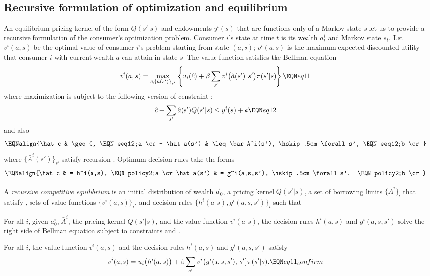 \subsection{Recursive formulation of optimization and equilibrium}
An equilibrium  pricing kernel of the form $Q(s'|s)$ and  endowments $y^i(s)$
that are  functions only of a Markov state $s$ let us to provide a
recursive formulation of the consumer's optimization problem.
Consumer $i$'s state at time $t$ is its wealth $a^i_t$ and Markov state $s_t$.
Let $v^i(a,s)$ be the optimal value of consumer $i$'s problem
starting from state $(a, s)$;     $v^i(a,s)$ is the maximum
expected discounted utility  that consumer $i$ with current wealth $a$
can attain in state $s$.
The value function satisfies the Bellman equation %
$$ v^i(a, s) = \max_{\hat c, \{\hat a(s')\}_{s'}} 
\left\{ u_i(\hat c) + \beta
\sum_{s'} v^i\bigl(\hat a(s'),s'\bigr) 
                 \pi (s' | s) \right\} \EQN eq11 $$
where  maximization is subject to the following version
of constraint :
$$ \hat c + \sum_{s'} \hat a(s') Q(s' | s)
     \leq  y^i(s) + a  \EQN eq12   $$
and also
$$\EQNalign{\hat c & \geq 0, \EQN eeq12;a \cr
           -   \hat a(s') & \leq \bar A^i(s'), \hskip.5cm \forall s',   \EQN eeq12;b \cr}$$
where $\{\bar A^i(s')\}_{s'}$ satisfy recursion
. 
Optimum decision rules take the forms
$$\EQNalign{\hat c & =  h^i(a,s), \EQN policy2;a \cr
  \hat a(s') & = g^i(a,s,s'), \hskip.5cm \forall s'. 
                                  \EQN policy2;b \cr}$$


\medskip{} A {\it  recursive competitive equilibrium} is
an initial distribution of wealth $\vec a_0$, 
a pricing kernel $Q(s' | s)$, 
a set of borrowing limits $\{\bar A^i \}_i$ that
satisfy ,
sets of value functions $\{v^i(a,s)\}_i$, and
decision rules $\{h^i(a,s), g^i(a,s,s')\}_i$ such
that

\medskip
{} For all $i$, given
$a^i_0$, $\bar A^i$, the pricing kernel $Q(s' | s)$, and
the value function $v^i(a,s)$, the decision rules
$h^i(a,s)$ and $g^i(a,s,s')$ solve the right side
of Bellman equation  subject to constraints
 and .

\medskip
{} For all $i$, the value function
$v^i(a,s)$ and the decision rules
$h^i(a,s)$ and $g^i(a,s,s')$ satisfy
$$ v^i(a, s) = u_i\bigl(h^i(a,s)\bigr) + \beta
\sum_{s'} v^i\bigl(g^i(a,s,s'),\,s'\bigr) 
                 \pi (s' | s).  \EQN eq11_confirm $$

